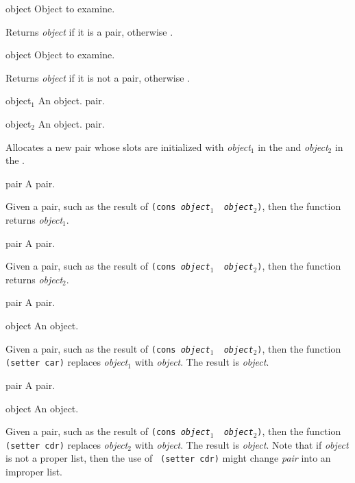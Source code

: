 \begin{optDefinition}
%
\begin{arguments}
    \item[object] Object to examine.
\end{arguments}
%
\result%
Returns {\em object\/} if it is a pair, otherwise \nil{}.

%
\begin{arguments}
    \item[object] Object to examine.
\end{arguments}
%
\result%
Returns {\em object\/} if it is not a pair, otherwise \nil{}.

%
\begin{arguments}
    \item[object$_1$] An object.  pair.
    \item[object$_2$] An object.  pair.
\end{arguments}
%
\result%
Allocates a new pair whose slots are initialized with {\em object$_1$} in the
 and {\em object$_2$} in the .

%
\begin{arguments}
    \item[pair] A pair.
\end{arguments}
%
\result%
Given a pair, such as the result of {\tt (cons {\em object$_1$} {\em
        object$_2$})}, then the function  returns {\em
    object$_1$}.

%
\begin{arguments}
    \item[pair] A pair.
\end{arguments}
%
\result%
Given a pair, such as the result of {\tt (cons {\em object$_1$} {\em
        object$_2$})}, then the function  returns {\em
    object$_2$}.

%
\begin{arguments}
    \item[pair] A pair.
    \item[object] An object.
\end{arguments}
%
\result%
Given a pair, such as the result of {\tt (cons {\em object$_1$} {\em
        object$_2$})}, then the function {\tt (setter car)} replaces {\em
    object$_1$} with {\em object}.  The result is {\em object}.

%
\begin{arguments}
    \item[pair] A pair.
    \item[object] An object.
\end{arguments}
%
\result%
Given a pair, such as the result of {\tt (cons {\em object$_1$} {\em
        object$_2$})}, then the function {\tt (setter cdr)} replaces {\em
    object$_2$} with {\em object}.  The result is {\em object}.
%
\remarks%
Note that if {\em object\/} is not a proper list, then the use of {\tt
(setter cdr)} might change {\em pair\/} into an improper list.


\end{optDefinition}
